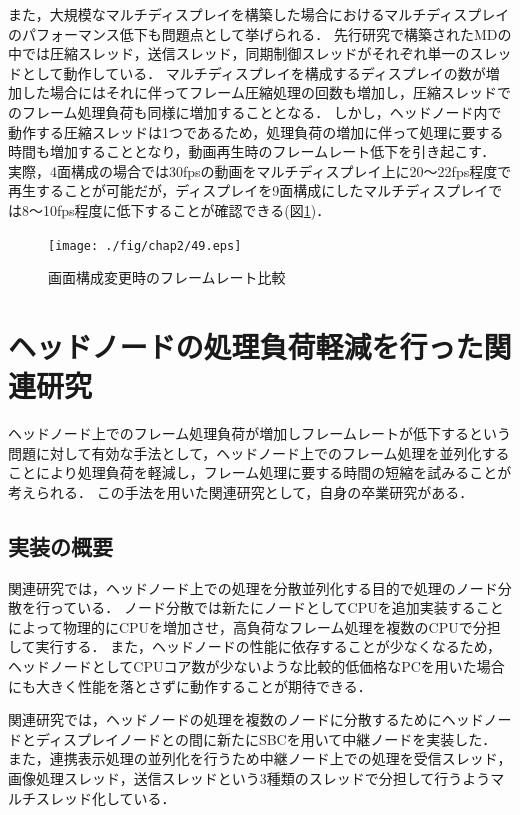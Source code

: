 また，大規模なマルチディスプレイを構築した場合におけるマルチディスプレイのパフォーマンス低下も問題点として挙げられる．
先行研究で構築されたMDの中では圧縮スレッド，送信スレッド，同期制御スレッドがそれぞれ単一のスレッドとして動作している．
マルチディスプレイを構成するディスプレイの数が増加した場合にはそれに伴ってフレーム圧縮処理の回数も増加し，圧縮スレッドでのフレーム処理負荷も同様に増加することとなる．
しかし，ヘッドノード内で動作する圧縮スレッドは1つであるため，処理負荷の増加に伴って処理に要する時間も増加することとなり，動画再生時のフレームレート低下を引き起こす．
実際，4面構成の場合では30fpsの動画をマルチディスプレイ上に20〜22fps程度で再生することが可能だが，ディスプレイを9面構成にしたマルチディスプレイでは8〜10fps程度に低下することが確認できる(図\ref{framerate_49})．

\begin{figure}[H]
  \hspace*{\fill}
  \texttt{[image: ./fig/chap2/49.eps]}
  \hspace*{\fill}
  \caption{画面構成変更時のフレームレート比較}
  \label{framerate_49}
 \end{figure}


 \section*{ヘッドノードの処理負荷軽減を行った関連研究}
 
ヘッドノード上でのフレーム処理負荷が増加しフレームレートが低下するという問題に対して有効な手法として，ヘッドノード上でのフレーム処理を並列化することにより処理負荷を軽減し，フレーム処理に要する時間の短縮を試みることが考えられる．
この手法を用いた関連研究として，自身の卒業研究がある．

\subsection*{実装の概要}

関連研究では，ヘッドノード上での処理を分散並列化する目的で処理のノード分散を行っている．
ノード分散では新たにノードとしてCPUを追加実装することによって物理的にCPUを増加させ，高負荷なフレーム処理を複数のCPUで分担して実行する．
また，ヘッドノードの性能に依存することが少なくなるため，ヘッドノードとしてCPUコア数が少ないような比較的低価格なPCを用いた場合にも大きく性能を落とさずに動作することが期待できる．

関連研究では，ヘッドノードの処理を複数のノードに分散するためにヘッドノードとディスプレイノードとの間に新たにSBCを用いて中継ノードを実装した．
また，連携表示処理の並列化を行うため中継ノード上での処理を受信スレッド，画像処理スレッド，送信スレッドという3種類のスレッドで分担して行うようマルチスレッド化している．

